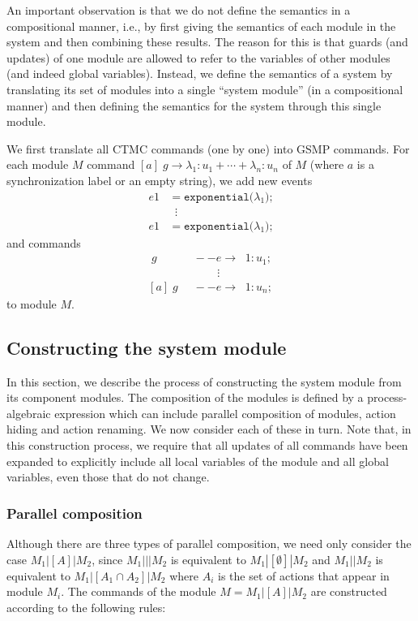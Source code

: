 \documentclass{article}
\newcommand{\arc}[1]{\;\;--{#1}\longrightarrow \;\;}
\newcommand{\code}[1]{\texttt{#1}}
\begin{document}
An important observation is that we do not define the semantics in a compositional manner, i.e., by first giving the semantics of each module in the system and then combining these results. 
The reason for this is that guards (and updates) of one module are allowed to refer to the variables of other modules (and indeed global variables). 
Instead, we define the semantics of a system by translating its set of modules into a single “system module” (in a compositional manner) and then defining the semantics for the system through this single module.

We first translate all CTMC commands (one by one) into GSMP commands.
For each module $M$ command $[a] \; g \rightarrow \lambda_1 : u_1 + \cdots + \lambda_n : u_n$ of $M$ (where $a$ is a synchronization label or an empty string), we add 
new events 
\begin{align*}
e1 &= \code{exponential(} \lambda_1 \code{);} \\
& \; \; \vdots \\
e1 &= \code{exponential(} \lambda_1 \code{);}
\end{align*}
and commands 
\begin{align*}
[a] \; g &\arc{e} 1 : u_1; \\
& \quad \quad \: \: \: \vdots \\
[a] \; g &\arc{e} 1 : u_n;
\end{align*}
to module $M$.

\subsection*{Constructing the system module}
In this section, we describe the process of constructing the system module from its component modules. 
The composition of the modules is defined by a process-algebraic expression which can include parallel composition of modules, action hiding and action renaming. 
We now consider each of these in turn. Note that, in this construction process, we require that all updates of all commands have been expanded to explicitly include all local variables of the module and all global variables, even those that do not change.


\subsubsection*{Parallel composition}
Although there are three types of parallel composition, we need only consider the case
$M_1|[A]|M_2$, since $M_1|||M_2$ is equivalent to $M_1|[\emptyset]|M_2$ and $M_1||M_2$ is equivalent to $M_1|[A_1 \cap A_2]|M_2$ where $A_i$ is the set of actions that appear in module $M_i$. 
The commands of the module $M = M_1|[A]|M_2$ are constructed according to the following rules:
\end{document}
